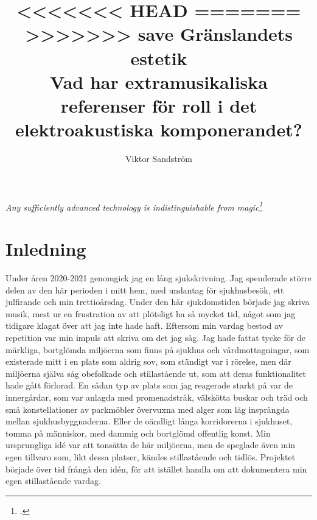 \documentclass{article}
\title{%
<<<<<<< HEAD
=======
>>>>>>> save
	Gränslandets estetik \\
	\large{Vad har extramusikaliska referenser för roll i det elektroakustiska komponerandet?}
}
\author{Viktor Sandström}
\begin{document}
\maketitle
\newpage
\tableofcontents
\newpage



\begin{center}
	\hspace{0pt}
	\vfill
	\emph{Any sufficiently advanced technology is indistinguishable from magic\footcite{ArthurCClarkeMagic}}
	\vfill
	\hspace{0pt}
\end{center}
\newpage

\section{Inledning}
Under åren 2020-2021 genomgick jag en lång sjukskrivning. Jag spenderade större delen av den här perioden i
mitt hem, med undantag för sjukhusbesök, ett julfirande och min trettioårsdag. Under den här sjukdomstiden
började jag skriva musik, mest ur en frustration av att plötsligt ha så mycket tid, något som jag
tidigare klagat över att jag inte hade haft. Eftersom min vardag bestod av repetition var min impuls att
skriva om det jag såg. Jag hade fattat tycke för de märkliga, bortglömda miljöerna som finns på sjukhus och
vårdmottagningar, som existerade mitt i en plats som aldrig sov, som ständigt var i rörelse, men där miljöerna
själva såg obefolkade och stillastående ut, som att deras funktionalitet hade gått förlorad. En sådan typ av
plats som jag reagerade starkt på var de innergårdar, som var anlagda med promenadstråk, välskötta buskar
och träd och små konstellationer av parkmöbler övervuxna med alger som låg insprängda mellan
sjukhusbyggnaderna. Eller de oändligt långa korridorerna i sjukhuset, tomma på människor, med dammig och
bortglömd offentlig konst. Min ursprungliga idé var att tonsätta de här miljöerna, men de speglade även
min egen tillvaro som, likt dessa platser, kändes stillastående och tidlös. Projektet började över tid frångå
den idén, för att istället handla om att dokumentera min egen stillastående vardag.
\end{document}
